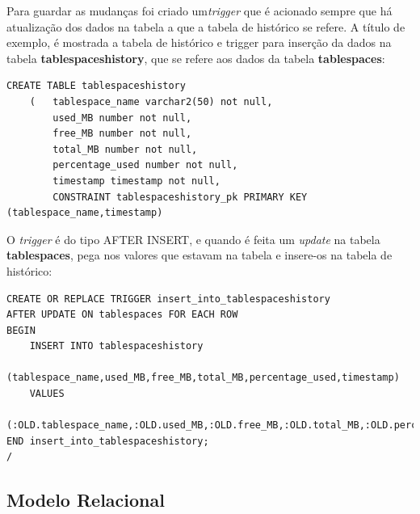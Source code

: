 Para guardar as mudanças  foi criado um\textit{trigger} que é acionado sempre que há atualização dos dados na tabela a que a tabela de histórico se refere. A título de exemplo, é mostrada a tabela de histórico e trigger para inserção da dados na tabela \textbf{tablespaceshistory}, que se refere aos dados da tabela \textbf{tablespaces}:
\\


\begin{verbatim}
CREATE TABLE tablespaceshistory
    (   tablespace_name varchar2(50) not null,
        used_MB number not null,
        free_MB number not null,
        total_MB number not null,
        percentage_used number not null,
        timestamp timestamp not null,
        CONSTRAINT tablespaceshistory_pk PRIMARY KEY (tablespace_name,timestamp)

\end{verbatim}
O \textit{trigger} é do tipo AFTER INSERT, e quando é feita um \textit{update} na tabela \textbf{tablespaces}, pega nos valores que estavam na tabela e insere-os na tabela de histórico:
\begin{verbatim}
CREATE OR REPLACE TRIGGER insert_into_tablespaceshistory
AFTER UPDATE ON tablespaces FOR EACH ROW
BEGIN
    INSERT INTO tablespaceshistory
        (tablespace_name,used_MB,free_MB,total_MB,percentage_used,timestamp)
    VALUES
        (:OLD.tablespace_name,:OLD.used_MB,:OLD.free_MB,:OLD.total_MB,:OLD.percentage_used,:OLD.timestamp);   
END insert_into_tablespaceshistory;
/
\end{verbatim}





\newpage
\subsection*{Modelo Relacional}

